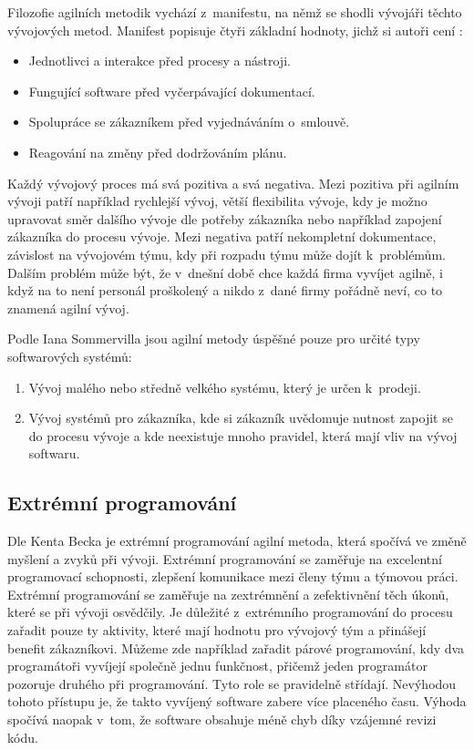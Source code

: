 \documentclass[czech,master]{diploma}
\begin{document}
Filozofie agilních metodik vychází z~manifestu, na němž se shodli vývojáři těchto vývojových metod. Manifest popisuje čtyři základní hodnoty, jichž si autoři cení \cite{ref:agilne_manifesto}:

\begin{itemize}
\item Jednotlivci a interakce před procesy a nástroji.
\item Fungující software před vyčerpávající dokumentací.
\item Spolupráce se zákazníkem před vyjednáváním o~smlouvě.
\item Reagování na změny před dodržováním plánu.
\end{itemize}

Každý vývojový proces má svá pozitiva a svá negativa. Mezi pozitiva při agilním vývoji patří například rychlejší vývoj, větší flexibilita vývoje, kdy je možno upravovat směr dalšího vývoje dle potřeby zákazníka nebo například zapojení zákazníka do procesu vývoje. Mezi negativa patří nekompletní dokumentace, závislost na vývojovém týmu, kdy při rozpadu týmu může dojít k~problémům. Dalším problém může být, že v~dnešní době chce každá firma vyvíjet agilně, i když na to není personál proškolený a nikdo z~dané firmy pořádně neví, co to znamená agilní vývoj.

Podle Iana Sommervilla \cite{ref:sommerrville_agile_products} jsou agilní metody úspěšné pouze pro určité typy softwarových systémů:

\begin{enumerate}
\item Vývoj malého nebo středně velkého systému, který je určen k~prodeji.
\item Vývoj systémů pro zákazníka, kde si zákazník uvědomuje nutnost zapojit se do procesu vývoje a kde neexistuje mnoho pravidel, která mají vliv na vývoj softwaru.
\end{enumerate}


\subsection{Extrémní programování}
Dle Kenta Becka \cite{ref:what_is_xp} je extrémní programování agilní metoda, která spočívá ve změně myšlení a zvyků při vývoji. Extrémní programování se zaměřuje na excelentní programovací schopnosti, zlepšení komunikace mezi členy týmu a týmovou práci. Extrémní programování se zaměřuje na zextrémnění a zefektivnění těch úkonů, které se při vývoji osvědčily. Je důležité z~extrémního programování do procesu zařadit pouze ty aktivity, které mají hodnotu pro vývojový tým a přinášejí benefit zákazníkovi. Můžeme zde například zařadit párové programování, kdy dva programátoři vyvíjejí společně jednu funkčnost, přičemž jeden programátor pozoruje druhého při programování. Tyto role se pravidelně střídají. Nevýhodou tohoto přístupu je, že takto vyvíjený software zabere více placeného času. Výhoda spočívá naopak v~tom, že software obsahuje méně chyb díky vzájemné revizi kódu.
\end{document}
